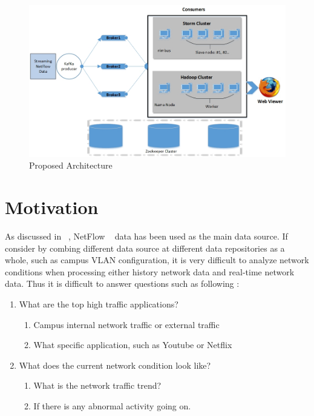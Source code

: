 \documentclass[conference]{IEEEtran}
\begin{document}
\begin{figure}[!ht]
\centering
\includegraphics[scale = 0.35]{figure/arch}
\caption{Proposed Architecture}
\label{arch_drawing}
\vspace{-.1in}
\end{figure}

\section{Motivation}\label{sec:motivation}
As discussed in ~\cite{zhao2014can}, NetFlow ~\cite{netflow} data has been used as the main data source. If consider by combing different data source at different data repositories as a whole, such as campus VLAN configuration, it is very difficult to analyze network conditions when processing either history network data and real-time network data. Thus it is difficult to answer questions such as following :

\begin{enumerate}
\item What are the top high traffic applications?
	\begin{enumerate}
		\item Campus internal network traffic or external traffic
		\item What specific application, such as Youtube or Netflix
	\end {enumerate}
\item What does the current network condition look like?
	\begin{enumerate}
		\item What is the network traffic trend?
		\item If there is any abnormal activity going on.
		\end {enumerate}
\end{enumerate}
\end{document}
